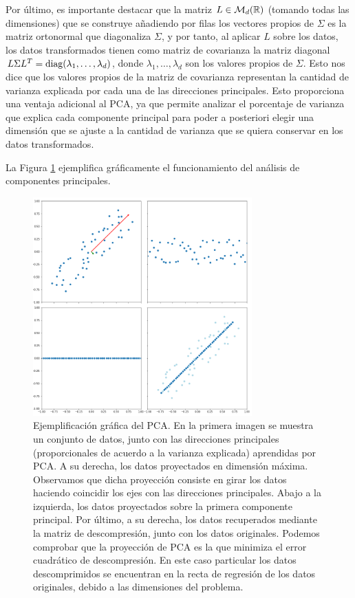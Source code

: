 Por último, es importante destacar que la matriz $L \in \mathcal{M}_{d}(\mathbb{R})$ (tomando todas las dimensiones) que se construye añadiendo por filas los vectores propios de $\Sigma$ es la matriz ortonormal que diagonaliza $\Sigma$, y por tanto, al aplicar $L$ sobre los datos, los datos transformados tienen como matriz de covarianza la matriz diagonal $L\Sigma L^T = \operatorname{diag}(\lambda_1,\dots,\lambda_d)$, donde $\lambda_1,\dots,\lambda_d$ son los valores propios de $\Sigma$. Esto nos dice que los valores propios de la matriz de covarianza representan la cantidad de varianza explicada por cada una de las direcciones principales. Esto proporciona una ventaja adicional al PCA, ya que permite analizar el porcentaje de varianza que explica cada componente principal para poder a posteriori elegir una dimensión que se ajuste a la cantidad de varianza que se quiera conservar en los datos transformados.

La Figura \ref{fig:pca} ejemplifica gráficamente el funcionamiento del análisis de componentes principales.

\begin{figure}[h]
    \centering
    \includegraphics[width=0.75\textwidth]{./images/pca.png}
    \caption{Ejemplificación gráfica del PCA. En la primera imagen se muestra un conjunto de datos, junto con las direcciones principales (proporcionales de acuerdo a la varianza explicada) aprendidas por PCA. A su derecha, los datos proyectados en dimensión máxima. Observamos que dicha proyección consiste en girar los datos haciendo coincidir los ejes con las direcciones principales. Abajo a la izquierda, los datos proyectados sobre la primera componente principal. Por último, a su derecha, los datos recuperados mediante la matriz de descompresión, junto con los datos originales. Podemos comprobar que la proyección de PCA es la que minimiza el error cuadrático de descompresión. En este caso particular los datos descomprimidos se encuentran en la recta de regresión de los datos originales, debido a las dimensiones del problema.} \label{fig:pca}
\end{figure}

